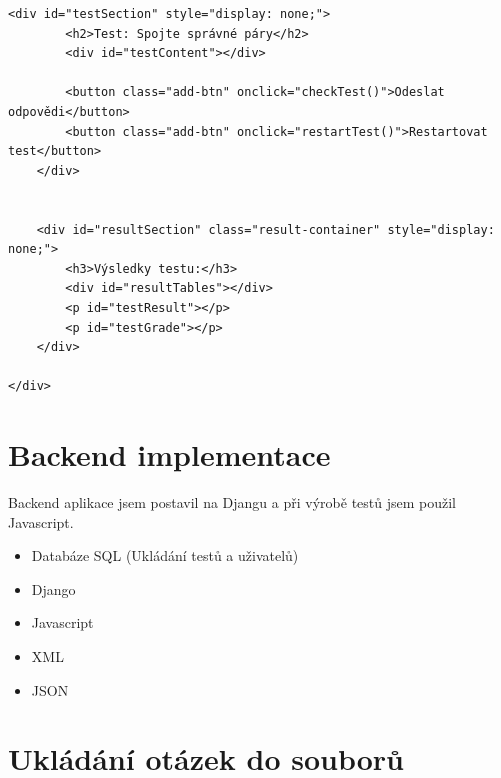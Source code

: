 \documentclass[12pt, a4paper, twoside, openright]{report}
\begin{document}
\begin{lstlisting}[style=Python]
    <div id="testSection" style="display: none;">
        <h2>Test: Spojte správné páry</h2>
        <div id="testContent"></div>

        <button class="add-btn" onclick="checkTest()">Odeslat odpovědi</button>
        <button class="add-btn" onclick="restartTest()">Restartovat test</button>
    </div>
    

    <div id="resultSection" class="result-container" style="display: none;">
        <h3>Výsledky testu:</h3>
        <div id="resultTables"></div>
        <p id="testResult"></p>
        <p id="testGrade"></p>
    </div>

</div>
	\end{lstlisting}
	



	\section{Backend implementace}
	Backend aplikace jsem postavil na Djangu a při výrobě testů jsem použil Javascript.

	\begin{itemize}
		\item Databáze SQL (Ukládání testů a uživatelů)
		\item Django
		\item Javascript
            \item XML
            \item JSON
	\end{itemize}


	\section{Ukládání otázek do souborů}
\end{document}
